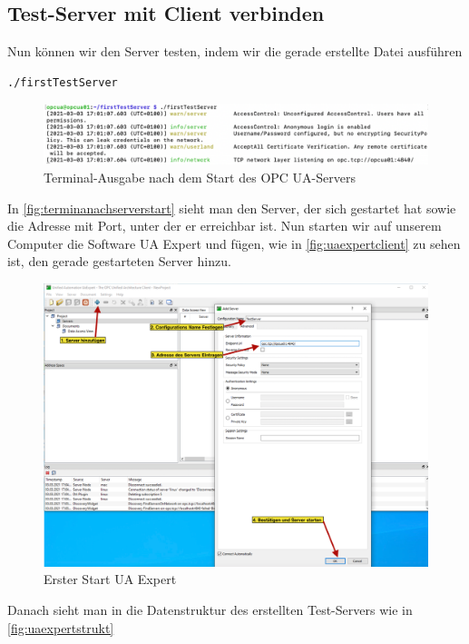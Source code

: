 \subsection{Test-Server mit Client verbinden}
Nun können wir den Server testen, indem wir die gerade erstellte Datei ausführen
\begin{lstlisting}[language=Bash]
./firstTestServer
\end{lstlisting}
\begin{figure}[H]
	\centering
	\includegraphics[width=1\linewidth]{abb/TerminaNachServerStart}
	\caption{Terminal-Ausgabe nach dem Start des OPC UA-Servers}
	\label{fig:terminanachserverstart}
\end{figure}


In \autoref{fig:terminanachserverstart} sieht man den Server, der sich gestartet hat sowie die Adresse mit Port, unter der er erreichbar ist. Nun starten wir auf unserem Computer die Software UA Expert und fügen, wie in \autoref{fig:uaexpertclient} zu sehen ist, den gerade gestarteten Server hinzu. 

\begin{figure}[H]
	\centering
	\includegraphics[width=1\linewidth]{abb/UA_ExpertClient}
	\caption{Erster Start UA Expert}
	\label{fig:uaexpertclient}
\end{figure}

Danach sieht man in  die Datenstruktur des erstellten Test-Servers wie in \autoref{fig:uaexpertstrukt}

